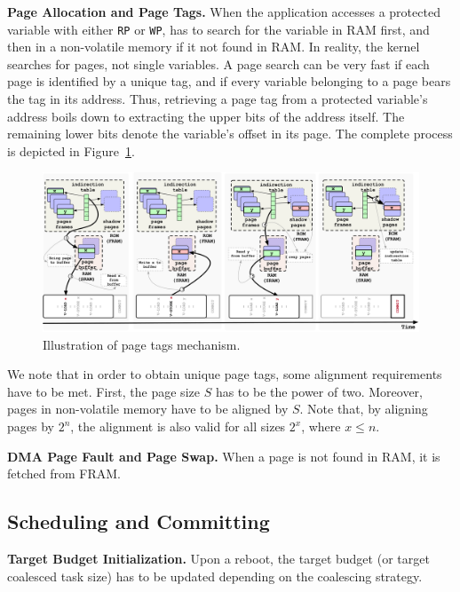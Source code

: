 \noindent \textbf{Page Allocation and Page Tags.} When the \sys application accesses a protected variable with either \texttt{RP} or \texttt{WP}, \sys has to search for the variable in RAM first, and then in a non-volatile memory if it not found in RAM. In reality, the \sys kernel searches for pages, not single variables. A page search can be very fast if each page is identified by a unique tag, and if every variable belonging to a page bears the tag in its address. Thus, retrieving a page tag from a protected variable's address boils down to extracting the upper bits of the address itself. The remaining lower bits denote the variable's offset in its page. The complete process is depicted in Figure~\ref{figure:coala_page_tags}.

\begin{figure}
	\centering
	\includegraphics[width=\textwidth]{figures/graffle/paging.pdf}
	\caption{Illustration of \sys page tags mechanism.}
	\label{figure:coala_page_tags}
\end{figure}

We note that in order to obtain unique page tags, some alignment requirements have to be met. First, the page size $S$ has to be the power of two. Moreover, pages in non-volatile memory have to be aligned by $S$. Note that, by aligning pages by $2^n$, the alignment is also valid for all sizes $2^x$, where $x \leq n$.

\noindent \textbf{DMA Page Fault and Page Swap.} When a page is not found in RAM, it is fetched from FRAM. 

\subsection{\sys Scheduling and Committing}

\noindent \textbf{Target Budget Initialization.} Upon a reboot, the target budget (or target coalesced task size) has to be updated depending on the coalescing strategy. 

